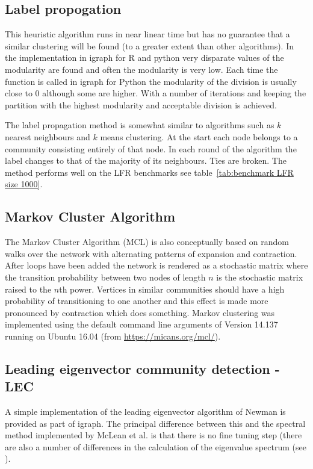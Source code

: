 \subsection{Label propogation}
\label{sec:label propogation}
This heuristic algorithm runs in near linear time but has no guarantee that a similar clustering will be found (to a greater extent than other algorithms). In the implementation in igraph for R and python very disparate values of the modularity are found and often the modularity is very low\cite{raghavan2007near}. Each time the function is called in igraph for Python the modularity of the division is usually close to 0 although some are higher. With a number of iterations and keeping the partition with the highest modularity and acceptable division is achieved. 

The label propagation method is somewhat similar to algorithms such as $k$ nearest neighbours and $k$ means clustering. At the start each node belongs to a community consisting entirely of that node. In each round of the algorithm the label changes to that of the majority of its neighbours. Ties are broken. The method performs well on the LFR benchmarks see table~\ref{tab:benchmark LFR size 1000}.

\subsection{Markov Cluster Algorithm}
\label{sec:markov clustering}
The Markov Cluster Algorithm (MCL) is also conceptually based on random walks over the network with alternating patterns of expansion and contraction. After loops have been added the network is rendered as a stochastic matrix where the transition probability between two nodes of length $n$ is the stochastic matrix raised to the $n$th power. Vertices in similar communities should have a high probability of transitioning to one another and this effect is made more pronounced by contraction which does something. Markov clustering was implemented using the default command line arguments of Version 14.137 running on Ubuntu 16.04 (from \url{https://micans.org/mcl/})\cite{dongen2000graph}.


\subsection{Leading eigenvector community detection - LEC}
\label{sec:Leading eigenvector method}
A simple implementation of the leading eigenvector algorithm of Newman is provided as part of igraph. The principal difference between this and the spectral method implemented by McLean et al. is that there is no fine tuning step (there are also a number of differences in the calculation of the eigenvalue spectrum (see \cite{mclean2016improved}).  




